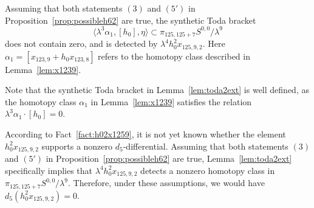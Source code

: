 \documentclass{amsart}
\numberwithin{equation}{section}
\begin{document}
\begin{lemma} \label{lem:toda2ext}
    Assuming that both statements $(3)$ and $(5')$ in Proposition~\ref{prop:possibleh62} are true, the synthetic Toda bracket
$$\langle \lambda^3 \alpha_1, [h_0], \eta \rangle \subset \pi_{125,125+7} S^{0,0}/\lambda^9$$
    does not contain zero, and is detected by $\lambda^4 h_0^2x_{125,9,2}$. Here $\alpha_1 = [x_{123,9}+h_0x_{123,8}]$ refers to the homotopy class described in Lemma~\ref{lem:x1239}.
\end{lemma}

Note that the synthetic Toda bracket in Lemma~\ref{lem:toda2ext} is well defined, as the homotopy class $\alpha_1$ in Lemma~\ref{lem:x1239} satisfies the relation $\lambda^3 \alpha_1 \cdot [h_0] = 0$.

\begin{remark} \label{rem:h02x1259}
    According to Fact~\ref{fact:h02x1259}, it is not yet known whether the element $h_0^2x_{125,9,2}$ supports a nonzero $d_5$-differential. Assuming that both statements $(3)$ and $(5')$ in Proposition~\ref{prop:possibleh62} are true, Lemma~\ref{lem:toda2ext} specifically implies that $\lambda^4 h_0^2x_{125,9,2}$ detects a nonzero homotopy class in $\pi_{125,125+7} S^{0,0}/\lambda^9$. Therefore, under these assumptions, we would have $d_5(h_0^2x_{125,9,2}) = 0$. 
\end{remark}
\end{document}
